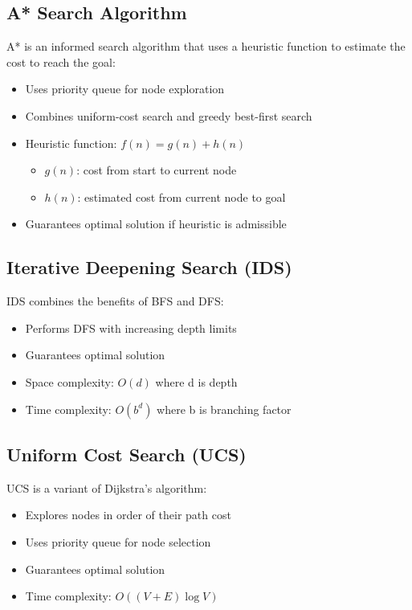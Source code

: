 \documentclass[12pt,a4paper]{article}
\begin{document}
\subsection{A* Search Algorithm}
A* is an informed search algorithm that uses a heuristic function to estimate the cost to reach the goal:

\begin{itemize}
    \item Uses priority queue for node exploration
    \item Combines uniform-cost search and greedy best-first search
    \item Heuristic function: $f(n) = g(n) + h(n)$
    \begin{itemize}
        \item $g(n)$: cost from start to current node
        \item $h(n)$: estimated cost from current node to goal
    \end{itemize}
    \item Guarantees optimal solution if heuristic is admissible
\end{itemize}

\subsection{Iterative Deepening Search (IDS)}
IDS combines the benefits of BFS and DFS:

\begin{itemize}
    \item Performs DFS with increasing depth limits
    \item Guarantees optimal solution
    \item Space complexity: $O(d)$ where d is depth
    \item Time complexity: $O(b^d)$ where b is branching factor
\end{itemize}

\subsection{Uniform Cost Search (UCS)}
UCS is a variant of Dijkstra's algorithm:

\begin{itemize}
    \item Explores nodes in order of their path cost
    \item Uses priority queue for node selection
    \item Guarantees optimal solution
    \item Time complexity: $O((V + E)\log V)$
\end{itemize}
\end{document}
